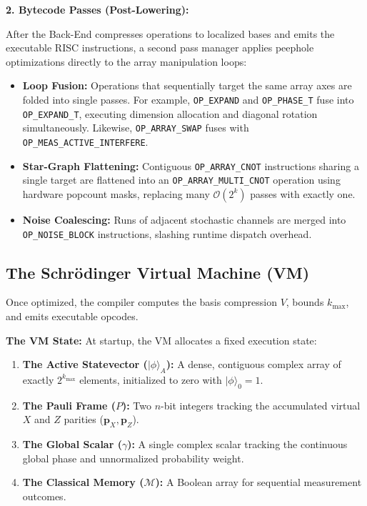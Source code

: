 \documentclass[11pt]{article}
\begin{document}
\textbf{2. Bytecode Passes (Post-Lowering):}

After the Back-End compresses operations to localized bases and emits the executable RISC instructions, a second pass manager applies peephole optimizations directly to the array manipulation loops:
\begin{itemize}
    \item \textbf{Loop Fusion:} Operations that sequentially target the same array axes are folded into single passes. For example, \texttt{OP\_EXPAND} and \texttt{OP\_PHASE\_T} fuse into \texttt{OP\_EXPAND\_T}, executing dimension allocation and diagonal rotation simultaneously. Likewise, \texttt{OP\_ARRAY\_SWAP} fuses with \texttt{OP\_MEAS\_ACTIVE\_INTERFERE}.
    \item \textbf{Star-Graph Flattening:} Contiguous \texttt{OP\_ARRAY\_CNOT} instructions sharing a single target are flattened into an \texttt{OP\_ARRAY\_MULTI\_CNOT} operation using hardware popcount masks, replacing many $\mathcal{O}(2^k)$ passes with exactly one.
    \item \textbf{Noise Coalescing:} Runs of adjacent stochastic channels are merged into \texttt{OP\_NOISE\_BLOCK} instructions, slashing runtime dispatch overhead.
\end{itemize}

\subsection{The Schrödinger Virtual Machine (VM)}

Once optimized, the compiler computes the basis compression $V$, bounds $k_{\max}$, and emits executable opcodes.

\textbf{The VM State:} At startup, the VM allocates a fixed execution state:
\begin{enumerate}
    \item \textbf{The Active Statevector ($|\phi\rangle_A$):} A dense, contiguous complex array of exactly $2^{k_{\max}}$ elements, initialized to zero with $|\phi\rangle_0 = 1$.
    \item \textbf{The Pauli Frame ($P$):} Two $n$-bit integers tracking the accumulated virtual $X$ and $Z$ parities ($\mathbf{p}_X, \mathbf{p}_Z$).
    \item \textbf{The Global Scalar ($\gamma$):} A single complex scalar tracking the continuous global phase and unnormalized probability weight.
    \item \textbf{The Classical Memory ($\mathcal{M}$):} A Boolean array for sequential measurement outcomes.
\end{enumerate}
\end{document}
